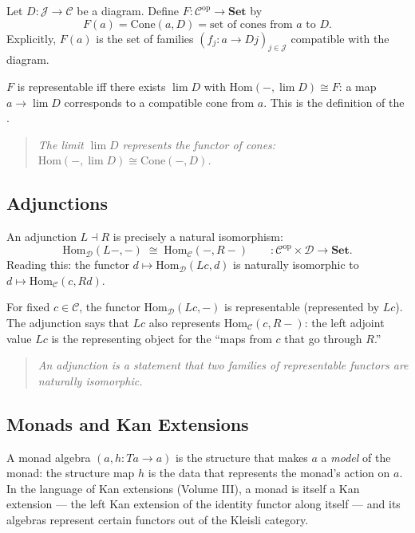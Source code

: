 Let $D : \mathcal{J} \to \mathcal{C}$ be a diagram. Define
$F : \mathcal{C}^{\mathrm{op}} \to \mathbf{Set}$ by
\[
  F(a) = \mathrm{Cone}(a, D) = \text{set of cones from } a \text{ to } D.
\]
Explicitly, $F(a)$ is the set of families $(f_j : a \to Dj)_{j \in
\mathcal{J}}$ compatible with the diagram.

$F$ is representable iff there exists $\lim D$ with $\mathrm{Hom}(-,
\lim D) \cong F$: a map $a \to \lim D$ corresponds to a compatible cone
from $a$. This is the definition of the .

\begin{quote}
\emph{The limit $\lim D$ represents the functor of cones:
$\mathrm{Hom}(-, \lim D) \cong \mathrm{Cone}(-, D)$.}
\end{quote}

\subsection{Adjunctions}

An adjunction $L \dashv R$ is precisely a natural isomorphism:
\[
  \mathrm{Hom}_\mathcal{D}(L-, -) \;\cong\; \mathrm{Hom}_\mathcal{C}(-, R-)
  \qquad : \mathcal{C}^{\mathrm{op}} \times \mathcal{D} \to \mathbf{Set}.
\]
Reading this: the functor $d \mapsto \mathrm{Hom}_\mathcal{D}(Lc, d)$ is
naturally isomorphic to $d \mapsto \mathrm{Hom}_\mathcal{C}(c, Rd)$.

For fixed $c \in \mathcal{C}$, the functor $\mathrm{Hom}_\mathcal{D}(Lc, -)$
is representable (represented by $Lc$). The adjunction says that $Lc$
also represents $\mathrm{Hom}_\mathcal{C}(c, R-)$: the left adjoint value
$Lc$ is the representing object for the ``maps from $c$ that go through $R$.''

\begin{quote}
\emph{An adjunction is a statement that two families of representable
functors are naturally isomorphic.}
\end{quote}

\subsection{Monads and Kan Extensions}

A monad algebra $(a, h: Ta \to a)$ is the structure that makes $a$ a
\emph{model} of the monad: the structure map $h$ is the data that
represents the monad's action on $a$. In the language of Kan extensions
(Volume III), a monad is itself a Kan extension --- the left Kan extension
of the identity functor along itself --- and its algebras represent
certain functors out of the Kleisli category.

